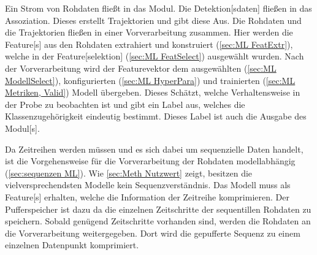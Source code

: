 Ein Strom von Rohdaten fließt in das \gls{Modul}. Die \gls{Detektion}[sdaten] fließen in das \gls{Assoziation}. Dieses erstellt Trajektorien und gibt diese Aus. Die Rohdaten und die Trajektorien fließen in einer Vorverarbeitung zusammen. Hier werden die \gls{Feature}[s] aus den Rohdaten extrahiert und konstruiert (\autoref{sec:ML FeatExtr}), welche in der \gls{Feature}[selektion] (\autoref{sec:ML FeatSelect}) ausgewählt wurden. Nach der Vorverarbeitung wird der \gls{Featurevektor} dem ausgewählten (\autoref{sec:ML ModellSelect}), konfigurierten (\autoref{sec:ML HyperPara}) und trainierten (\autoref{sec:ML Metriken, Valid}) Modell übergeben. Dieses Schätzt, welche Verhaltensweise in der Probe zu beobachten ist und gibt ein \gls{Label} aus, welches die Klassenzugehörigkeit eindeutig bestimmt. Dieses \gls{Label} ist auch die Ausgabe des \gls{Modul}[s]. \par

Da Zeitreihen  werden müssen und es sich dabei um sequenzielle Daten handelt, ist die Vorgehensweise für die Vorverarbeitung der Rohdaten modellabhängig (\autoref{sec:sequenzen ML}). Wie \autoref{sec:Meth Nutzwert} zeigt, besitzen die vielversprechendsten Modelle kein Sequenzverständnis. Das Modell muss als \gls{Feature}[s] erhalten, welche die Information der Zeitreihe komprimieren. Der Pufferspeicher ist dazu da die einzelnen Zeitschritte der sequentillen Rohdaten zu speichern. Sobald genügend Zeitschritte vorhanden sind, werden die Rohdaten an die Vorverarbeitung weitergegeben. Dort wird die gepufferte Sequenz zu einem einzelnen Datenpunkt komprimiert. 